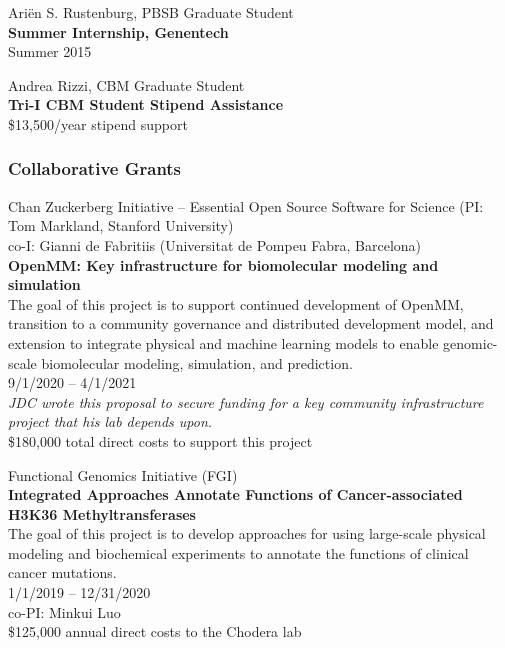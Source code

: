 \documentclass[10pt]{article}
\begin{document}
\vspace{1.5ex}

Ari\"{e}n S. Rustenburg, PBSB Graduate Student\\
{\bf Summer Internship, Genentech}\\
Summer 2015

\vspace{1.5ex}

Andrea Rizzi, CBM Graduate Student\\
{\bf Tri-I CBM Student Stipend Assistance}\\
\$13,500/year stipend support

\color{black}

\subsubsection*{Collaborative Grants}

Chan Zuckerberg Initiative -- Essential Open Source Software for Science (PI: Tom Markland, Stanford University)\\
co-I: Gianni de Fabritiis (Universitat de Pompeu Fabra, Barcelona)\\
{\bf OpenMM: Key infrastructure for biomolecular modeling and simulation}\\
The goal of this project is to support continued development of OpenMM, transition to a community governance and distributed development model, and extension to integrate physical and machine learning models to enable genomic-scale biomolecular modeling, simulation, and prediction.\\
9/1/2020 -- 4/1/2021\\
\emph{JDC wrote this proposal to secure funding for a key community infrastructure project that his lab depends upon.}\\
\$180,000 total direct costs to support this project

Functional Genomics Initiative (FGI)  \\
{\bf Integrated Approaches Annotate Functions of Cancer-associated H3K36 Methyltransferases} \\
The goal of this project is to develop approaches for using large-scale physical modeling and biochemical experiments to annotate the functions of clinical cancer mutations.\\
1/1/2019 -- 12/31/2020 \\
co-PI: Minkui Luo \\
\$125,000 annual direct costs to the Chodera lab
\end{document}
